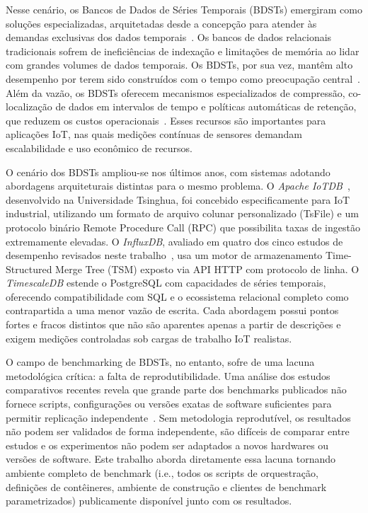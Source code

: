 Nesse cenário, os Bancos de Dados de Séries Temporais (BDSTs) emergiram como soluções
especializadas, arquitetadas desde a concepção para atender às demandas exclusivas dos dados
temporais~\citep{InfluxDataTimeSeries}. Os
bancos de dados relacionais tradicionais sofrem de ineficiências de indexação e limitações de
memória ao lidar com grandes volumes de dados temporais.
Os BDSTs, por sua vez, mantêm alto desempenho por terem sido construídos com o tempo
como preocupação central~\citep{naqvi2017influxdb}. Além da vazão,
os BDSTs oferecem mecanismos especializados de compressão, co-localização de dados em
intervalos de tempo e políticas automáticas de retenção, que reduzem os custos operacionais~\citep{Dunning2014}.
Esses recursos são importantes para aplicações IoT, nas quais medições contínuas de sensores demandam
escalabilidade e uso econômico de recursos.

O cenário dos BDSTs ampliou-se nos últimos anos, com sistemas adotando abordagens
arquiteturais distintas para o mesmo problema.
O \textit{Apache IoTDB}~\citep{wang2023iotdb}, desenvolvido na Universidade Tsinghua, foi
concebido especificamente para IoT industrial, utilizando um formato de arquivo colunar
personalizado (TsFile) e um protocolo binário Remote Procedure Call (RPC) que possibilita taxas de ingestão
extremamente elevadas. O \textit{InfluxDB}, avaliado em quatro dos cinco estudos de desempenho revisados neste
trabalho~\citep{naqvi2017influxdb,shah2022performance,lima2024avaliando,wang2023iotdb}, usa
um motor de armazenamento Time-Structured Merge Tree (TSM) exposto via API HTTP com
protocolo de linha. O \textit{TimescaleDB} estende o PostgreSQL com capacidades de séries
temporais, oferecendo compatibilidade com SQL e o ecossistema
relacional completo como contrapartida a uma menor vazão de escrita. Cada abordagem
possui pontos fortes e fracos distintos que não são aparentes apenas a partir de descrições
e exigem medições controladas sob cargas de trabalho IoT realistas.

O campo de benchmarking de BDSTs, no entanto, sofre de uma lacuna metodológica crítica: a
falta de reprodutibilidade. Uma análise dos estudos comparativos recentes revela que grande parte
dos benchmarks publicados não fornece scripts, configurações ou versões exatas de software
suficientes para permitir replicação independente~\citep{pereira2023mulletbench,shah2022performance,naqvi2017influxdb}.
Sem metodologia reprodutível, os resultados não podem ser validados de forma independente,
são difíceis de comparar entre estudos e os experimentos não podem ser adaptados a novos
hardwares ou versões de software. Este trabalho aborda diretamente essa lacuna tornando
ambiente completo de benchmark (i.e., todos os scripts de orquestração, definições de
contêineres, ambiente de construção e clientes de benchmark parametrizados)
publicamente disponível junto com os resultados.

